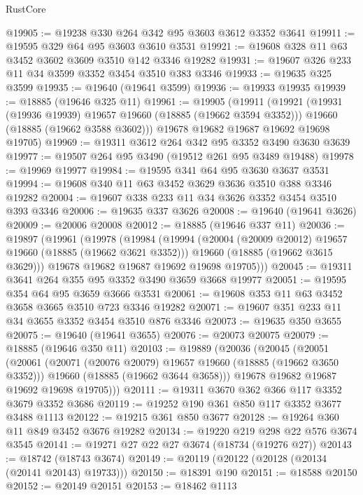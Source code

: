 \begin{lexlean}{RustCore}
\begin{coremodule}
@19905 := @19238 @330 @264 @342 @95 @3603 @3612 @3352 @3641
@19911 := @19595 @329 @64 @95 @3603 @3610 @3531
@19921 := @19608 @328 @11 @63 @3452 @3602 @3609 @3510 @142 @3346 @19282
@19931 := @19607 @326 @233 @11 @34 @3599 @3352 @3454 @3510 @383 @3346
@19933 := @19635 @325 @3599
@19935 := @19640 (@19641 @3599)
@19936 := @19933 @19935
@19939 := @18885 (@19646 @325 @11)
@19961 := @19905
    (@19911
      (@19921
        (@19931 (@19936 @19939) @19657 @19660 (@18885 (@19662 @3594 @3352)))
        @19660
        (@18885 (@19662 @3588 @3602)))
      @19678
      @19682
      @19687
      @19692
      @19698
      @19705)
@19969 := @19311 @3612 @264 @342 @95 @3352 @3490 @3630 @3639
@19977 := @19507 @264 @95 @3490 (@19512 @261 @95 @3489 @19488)
@19978 := @19969 @19977
@19984 := @19595 @341 @64 @95 @3630 @3637 @3531
@19994 := @19608 @340 @11 @63 @3452 @3629 @3636 @3510 @388 @3346 @19282
@20004 := @19607 @338 @233 @11 @34 @3626 @3352 @3454 @3510 @393 @3346
@20006 := @19635 @337 @3626
@20008 := @19640 (@19641 @3626)
@20009 := @20006 @20008
@20012 := @18885 (@19646 @337 @11)
@20036 := @19897
    (@19961
      (@19978
        (@19984
          (@19994
            (@20004 (@20009 @20012) @19657 @19660 (@18885 (@19662 @3621 @3352)))
            @19660
            (@18885 (@19662 @3615 @3629)))
          @19678
          @19682
          @19687
          @19692
          @19698
          @19705)))
@20045 := @19311 @3641 @264 @355 @95 @3352 @3490 @3659 @3668 @19977
@20051 := @19595 @354 @64 @95 @3659 @3666 @3531
@20061 := @19608 @353 @11 @63 @3452 @3658 @3665 @3510 @723 @3346 @19282
@20071 := @19607 @351 @233 @11 @34 @3655 @3352 @3454 @3510 @876 @3346
@20073 := @19635 @350 @3655
@20075 := @19640 (@19641 @3655)
@20076 := @20073 @20075
@20079 := @18885 (@19646 @350 @11)
@20103 := @19889
    (@20036
      (@20045
        (@20051
          (@20061
            (@20071 (@20076 @20079) @19657 @19660 (@18885 (@19662 @3650 @3352)))
            @19660
            (@18885 (@19662 @3644 @3658)))
          @19678
          @19682
          @19687
          @19692
          @19698
          @19705)))
@20111 := @19311 @3670 @362 @366 @117 @3352 @3679 @3352 @3686
@20119 := @19252 @190 @361 @850 @117 @3352 @3677 @3488 @1113
@20122 := @19215 @361 @850 @3677
@20128 := @19264 @360 @11 @849 @3452 @3676 @19282
@20134 := @19220 @219 @298 @22 @576 @3674 @3545
@20141 := @19271 @27 @22 @27 @3674 (@18734 (@19276 @27))
@20143 := @18742 (@18743 @3674)
@20149 := @20119 (@20122 (@20128 (@20134 (@20141 @20143) @19733)))
@20150 := @18391 @190
@20151 := @18588 @20150
@20152 := @20149 @20151
@20153 := @18462 @1113

\end{coremodule}
\end{lexlean}
